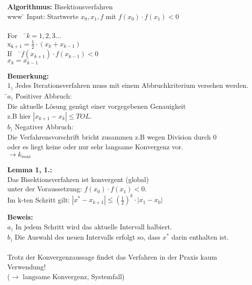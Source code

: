 \documentclass[10pt,a4paper]{article}
\begin{document}
\begin{tabbing}
\textbf{Algorithmus:} Bisektionsverfahren\\
www \= \kill
Input: Startwerte $x_0, x_1, f$ mit $f(x_0) \cdot f(x_1) <0$\\
\newline
\\\> For \ \ \=$k=1,2,3...$\\ 
\> \> $\mathrm{x_{k+1}}= \frac{1}{2} \cdot (x_k + x_{k-1})$ \\
\> \> If \ \ \=$f(x_{k+1})\cdot f(x_{k-1})<0$\\
\> \> \> $x_k=x_{k-1}$ \\
\end{tabbing}
\begin{tabbing}
\textbf{Bemerkung:}
\\$1_)$ Jedes Iterationsverfahren muss mit einem Abbruchkriterium versehen werden.\\
\hspace*{8mm} \=$a_)$ \= Positiver Abbruch:\\
\>\> Die aktuelle Lösung genügt einer vorgegebenen Genauigkeit\\
\>\> z.B hier $|x_{k+1}-x_k|\leq TOL$.\\
\>$b_)$ Negativer Abbruch:\\
\>\> Die Verfahrensvorschrift bricht zusammen z.B wegen Division durch 0\\
\>\> oder es liegt keine oder nur sehr langsame Konvergenz vor.\\
\>\> $\rightarrow k_{max}$
\end{tabbing}
\textbf{Lemma 1, 1.:}
\\Das Bisektionsverfahren ist konvergent (global)
\\unter der Voraussetzung: $f(x_0) \cdot f(x_1) <0$.
\\Im k-ten Schritt gilt: $|x^*-x_{k+1}|\leq (\frac{1}{2})^k \cdot |x_1-x_0|$ 
\begin{tabbing}\textbf{Beweis:}
\\$a_)$ In jedem Schritt wird das aktuelle Intervall halbiert.\\
$b_)$ Die Auswahl des neuen Intervalls erfolgt so, dass $x^*$ darin enthalten ist.\\
\newline
\\Trotz der Konvergenzaussage findet das Verfahren in der Praxis kaum Verwendung!
\\($\rightarrow$ langsame Konvergenz, Systemfall)
\end{tabbing}
\end{document}
